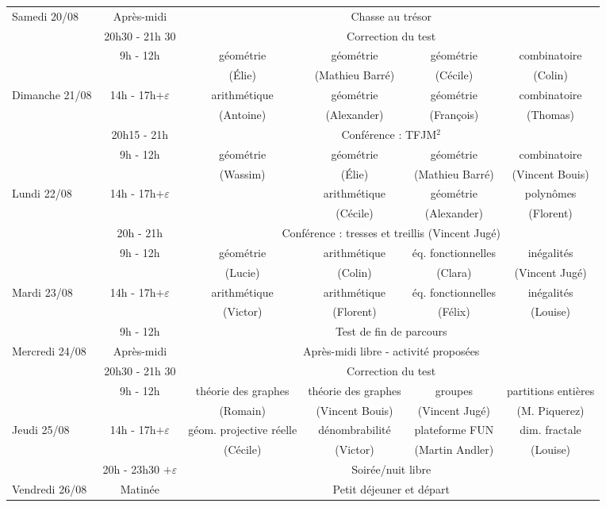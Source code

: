 \begin{center}
{\begin{tabular}{|l|c|c|c|c|c|}
\cline{2-6}
\small{Samedi 20/08} & Après-midi & \multicolumn{4}{c|}{Chasse au trésor} \\
\cline{2-6}
& 20h30 - 21h 30 & \multicolumn{4}{c|}{Correction du test} \\
\cline{2-6}
\hline
& 9h - 12h & géométrie & géométrie & géométrie & combinatoire\\
&& (Élie) & (Mathieu Barré) & (Cécile) & (Colin) \\
\cline{2-6}
\small{ Dimanche 21/08} & 14h - 17h$+ \varepsilon$ & arithmétique & géométrie & géométrie & combinatoire\\
&& (Antoine) & (Alexander)  & (François) & (Thomas) \\
\cline{2-6}
& 20h15 - 21h & \multicolumn{4}{c|}{Conférence : TFJM$^2$} \\
\hline
& 9h - 12h & géométrie & géométrie & géométrie & combinatoire \\
& &  (Wassim) &  (Élie) & (Mathieu Barré)  & (Vincent Bouis)\\
\cline{2-6}
\small{Lundi 22/08 } & 14h - 17h$+ \varepsilon$ & & arithmétique & géométrie & polynômes \\
& &  &  (Cécile) & (Alexander)  & (Florent)\\
\cline{2-6}
& 20h - 21h & \multicolumn{4}{c|}{Conférence : tresses et treillis (Vincent Jugé)} \\
\hline
& 9h - 12h & géométrie & arithmétique & éq. fonctionnelles & inégalités \\
& &  (Lucie) &  (Colin) & (Clara)  & (Vincent Jugé)\\
\cline{2-6}
\small{Mardi 23/08} & 14h - 17h$+ \varepsilon$ & arithmétique & arithmétique & éq. fonctionnelles & inégalités \\
& &  (Victor) &  (Florent) & (Félix)  & (Louise)\\
\hline
& 9h - 12h & \multicolumn{4}{c|}{Test de fin de parcours} \\
\cline{2-6}
\small{Mercredi 24/08} & Après-midi & \multicolumn{4}{c|}{Après-midi libre  - activité proposées} \\
\cline{2-6}
& 20h30 - 21h 30 & \multicolumn{4}{c|}{Correction du test} \\
\cline{2-6}
\hline
& 9h - 12h & théorie des graphes & théorie des graphes & groupes & partitions entières \\
& &  (Romain) &  (Vincent Bouis) & (Vincent Jugé)  & (M. Piquerez)\\
\cline{2-6}
\small{Jeudi 25/08} & 14h - 17h$+ \varepsilon$ & géom. projective réelle & dénombrabilité & plateforme FUN & dim. fractale \\
& &  (Cécile) &  (Victor) & (Martin Andler)  & (Louise)\\
\cline{2-6}
& 20h - 23h30 $+ \varepsilon$ & \multicolumn{4}{c|}{Soirée/nuit libre} \\\hline
Vendredi 26/08 & Matinée & \multicolumn{4}{c|}{Petit déjeuner et départ} \\
\hline
\end{tabular}}
\end{center}
